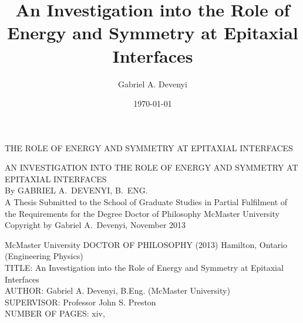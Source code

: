 \documentclass[letterpaper,12pt,twoside,openright]{report}
\title{An Investigation into the Role of Energy and Symmetry at Epitaxial Interfaces}
\author{Gabriel A. Devenyi}
\date{\today}
\begin{document}
\begin{titlepage} %
    \thispagestyle{empty}
    \vspace*{\fill}
    \begin{center}{\Large
    \uppercase{The Role of Energy and Symmetry at Epitaxial Interfaces}}
    \end{center}
    \vspace*{\fill}
    \setcounter{page}{0}
\end{titlepage}
\begin{titlepage} %
\thispagestyle{empty}
\centering
\vspace*{\fill} %
{\Large \uppercase{An Investigation into the Role of Energy and Symmetry at Epitaxial Interfaces}\\
\vfill
By GABRIEL A.\ DEVENYI, B.\ ENG.\\}
\vfill
A Thesis Submitted to the School of Graduate Studies in Partial Fulfilment of
the Requirements for the Degree Doctor of Philosophy
\vfill%
McMaster University \textcopyright{} Copyright by Gabriel A.\ Devenyi, November 2013
\end{titlepage}
{\noindent McMaster University DOCTOR OF PHILOSOPHY (2013) Hamilton, Ontario (Engineering Physics)\\
TITLE: An Investigation into the Role of Energy and Symmetry at Epitaxial Interfaces\\
AUTHOR: Gabriel A. Devenyi, B.Eng. (McMaster University)\\
SUPERVISOR: Professor John S. Preston\\
NUMBER OF PAGES: xiv,~\pageref{LastPage}}
\end{document}
